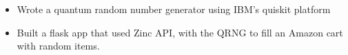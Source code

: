 
\begin{itemize}
    \item Wrote a quantum random number generator using IBM’s quiskit platform
    \item Built a flask app that used Zinc API, with the QRNG to fill an Amazon cart with random items.
\end{itemize}